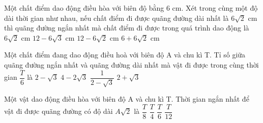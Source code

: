 \begin{ex}%
Một chất điểm dao động điều hòa với biên độ bằng 6 cm. Xét trong cùng một độ dài thời gian như nhau, nếu chất điểm đi được quãng đường dài nhất là $6\sqrt{2}$ cm thì quãng đường ngắn nhất mà chất điểm đi được trong quá trình dao động là
\choice
{$6\sqrt{2}$ cm}
{$12-6\sqrt{3}$ cm}
{\True $12-6\sqrt{2}$ cm}
{$6+6\sqrt{2}$ cm}
\end{ex} 
\begin{ex}%
Một chất điểm đang dao động điều hoà với biên độ A và chu kì T. Tỉ số giữa quãng đường ngắn nhất và quãng đường dài nhất mà vật đi được trong cùng thời gian $\dfrac{T}{6}$ là
\choice
{\True $2-\sqrt{3}$}
{$4-2\sqrt{3}$}
{$\dfrac{1}{2-\sqrt{3}}$}
{$2+\sqrt{3}$}
\end{ex} 

\begin{ex}%
Một vật dao động điều hòa với biên độ A và chu kì T. Thời gian ngắn nhất để vật đi được quãng đường có độ dài $A\sqrt{2}$ là
\choice
{$\dfrac{T}{8}$}
{\True $\dfrac{T}{4}$}
{$\dfrac{T}{6}$}
{$\dfrac{T}{12}$}
\end{ex} 

